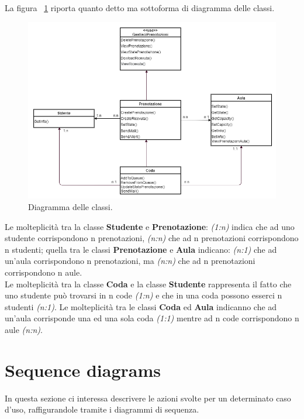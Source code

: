\noindent La figura ~\ref{figura: digramma delle classi} riporta quanto detto ma sottoforma di diagramma delle classi.\\

 \begin{figure}[htp]
\begin{center}
  \includegraphics[width=1 \textwidth]{Figure/class diagram.png}
    \caption{Diagramma delle classi.}\label{figura: digramma delle classi}
\end{center}
\end{figure}

Le molteplicità tra la classe \textbf{Studente} e \textbf{Prenotazione}: \emph{(1:n)} indica che ad uno studente corrispondono n prenotazioni, \emph{(n:n)} che ad n prenotazioni corrispondono n studenti; quella tra le classi \textbf{Prenotazione} e \textbf{Aula} indicano: \emph{(n:1)} che ad un’aula corrispondono n prenotazioni, ma \emph{(n:n)} che ad n prenotazioni corrispondono n aule.\\
Le molteplicità tra la classe \textbf{Coda} e la classe \textbf{Studente} rappresenta il fatto che uno studente può trovarsi in n code \emph{(1:n)} e che in una coda possono esserci n studenti \emph{(n:1)}. Le molteplicità tra le classi \textbf{Coda} ed \textbf{Aula} indicanno che ad un’aula corrisponde una ed una sola coda \emph{(1:1)} mentre ad n code corrispondono n aule \emph{(n:n)}.


\section{Sequence diagrams}

In questa sezione ci interessa descrivere le azioni svolte per un determinato caso d’uso, raffigurandole tramite i diagrammi di sequenza.


